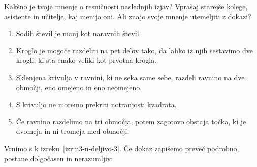 \begin{vaja}
  Kakšno je tvoje mnenje o resničnosti naslednjih izjav? Vprašaj
  starejše kolege, asistente in učitelje, kaj menijo oni. Ali znajo
  svoje mnenje utemeljiti z dokazi?
  \begin{enumerate}
  \item Sodih števil je manj kot naravnih števil.
  \item Kroglo je mogoče razdeliti na pet delov tako, da lahko iz njih
    sestavimo dve krogli, ki sta enako veliki kot prvotna krogla.
  \item Sklenjena krivulja v ravnini, ki ne seka same sebe, razdeli
    ravnino na dve območji, eno omejeno in eno neomejeno.
  \item S krivuljo ne moremo prekriti notranjosti kvadrata.
  \item Če ravnino razdelimo na tri območja, potem zagotovo obstaja
    točka, ki je dvomeja in ni tromeja med območji.
  \end{enumerate}
\end{vaja}

\noindent
%
Vrnimo s k izreku~\ref{izr:n3-n-deljivo-3}. Če dokaz zapišemo preveč
podrobno, postane dolgočasen in ne\-ra\-zumljiv:

